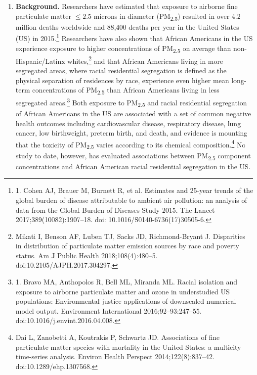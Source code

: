 \documentclass{article}\usepackage[]{graphicx}\usepackage[]{color}
\title{\vspace{-2.7cm}}
\author{\textbf{Midterm Examination} \\ \textbf{Katherine Wolf} \\ PH250C Spring 2020 \\ March 31, 2020}
\date{}
\begin{document}
\maketitle

\vspace{-.6cm}

\begin{enumerate}[label=\textbf{\arabic*.}]

  \item \textbf{Background.} Researchers have estimated that exposure to airborne fine particulate matter $\leq 2.5$ microns in diameter (PM\textsubscript{2.5}) resulted in over 4.2 million deaths worldwide and 88,400 deaths per year in the United States (US) in 2015.\footnote{1. Cohen AJ, Brauer M, Burnett R, et al. Estimates and 25-year trends of the global burden of disease attributable to ambient air pollution: an analysis of data from the Global Burden of Diseases Study 2015. The Lancet 2017;389(10082):1907–18. doi: 10.1016/S0140-6736(17)30505-6.} Researchers have also shown that African Americans in the US experience exposure to higher concentrations of PM\textsubscript{2.5} on average than non-Hispanic/Latinx whites,\footnote{Mikati I, Benson AF, Luben TJ, Sacks JD, Richmond-Bryant J. Disparities in distribution of particulate matter emission sources by race and poverty status. Am J Public Health 2018;108(4):480–5. doi:10.2105/AJPH.2017.304297.} and that African Americans living in more segregated areas, where racial residential segregation is defined as the physical separation of residences by race, experience even higher mean long-term concentrations of PM\textsubscript{2.5} than African Americans living in less segregated areas.\footnote{1. Bravo MA, Anthopolos R, Bell ML, Miranda ML. Racial isolation and exposure to airborne particulate matter and ozone in understudied US populations: Environmental justice applications of downscaled numerical model output. Environment International 2016;92–93:247–55. doi:10.1016/j.envint.2016.04.008.} Both exposure to PM\textsubscript{2.5} and racial residential segregation of African Americans in the US are associated with a set of common negative health outcomes including cardiovascular disease, respiratory disease, lung cancer, low birthweight, preterm birth, and death, and evidence is mounting that the toxicity of PM\textsubscript{2.5} varies according to its chemical composition.\footnote{Dai L, Zanobetti A, Koutrakis P, Schwartz JD. Associations of fine particulate matter species with mortality in the United States: a multicity time-series analysis. Environ Health Perspect 2014;122(8):837–42. doi:10.1289/ehp.1307568.} No study to date, however, has evaluated associations between PM\textsubscript{2.5} component concentrations and African American racial residential segregation in the US.
  

\end{enumerate}
\end{document}
